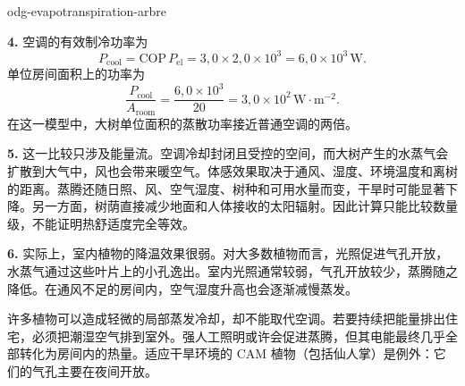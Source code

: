 \begin{exo}{odg-evapotranspiration-arbre}
\begin{solution}
\textbf{4.} 空调的有效制冷功率为
\[
P_{\text{cool}}=\mathrm{COP}\,P_{\mathrm{el}}
=3{,}0\times2{,}0\times10^3=6{,}0\times10^3\,\text{W}.
\]
单位房间面积上的功率为
\[
\frac{P_{\text{cool}}}{A_{\text{room}}}
=\frac{6{,}0\times10^3}{20}=3{,}0\times10^2\,\text{W}\!\cdot\!\text{m}^{-2}.
\]
在这一模型中，大树单位面积的蒸散功率接近普通空调的两倍。

\textbf{5.} 这一比较只涉及能量流。空调冷却封闭且受控的空间，而大树产生的水蒸气会扩散到大气中，风也会带来暖空气。体感效果取决于通风、湿度、环境温度和离树的距离。蒸腾还随日照、风、空气湿度、树种和可用水量而变，干旱时可能显著下降。另一方面，树荫直接减少地面和人体接收的太阳辐射。因此计算只能比较数量级，不能证明热舒适度完全等效。

\textbf{6.} 实际上，室内植物的降温效果很弱。对大多数植物而言，光照促进气孔开放，水蒸气通过这些叶片上的小孔逸出。室内光照通常较弱，气孔开放较少，蒸腾随之降低。在通风不足的房间内，空气湿度升高也会逐渐减慢蒸发。

许多植物可以造成轻微的局部蒸发冷却，却不能取代空调。若要持续把能量排出住宅，必须把潮湿空气排到室外。强人工照明或许会促进蒸腾，但其电能最终几乎全部转化为房间内的热量。适应干旱环境的 CAM 植物（包括仙人掌）是例外：它们的气孔主要在夜间开放。
\end{solution}
\end{exo}

